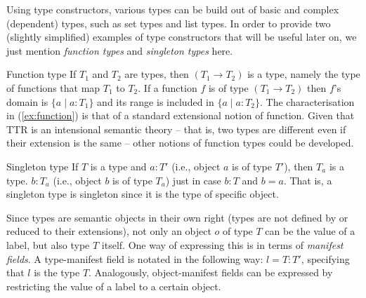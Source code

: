\documentclass[output=paper]{langsci/langscibook}
\begin{document}
{%

Using type constructors, various types can be build out of basic and complex (dependent) types, such as set types and list types. 
%
In order to provide two (slightly simplified) examples of type constructors that will be useful later on, we just mention \emph{function types}  and \emph{singleton types}  here.

\ea Function type \label{ex:function}
\ea If $T_1$ and $T_2$ are types, then $(T_1 \rightarrow T_2)$ is a type, namely the type of functions that map $T_1$ to $T_2$.
\ex If a function $f$ is of type $(T_1 \rightarrow T_2)$ then $f$'s domain is $\{a \mid a : T_1\}$ and its range is included in $\{a \mid a : T_2\}$.
\z
\z 
%
The characterisation in (\ref{ex:function}) is that of a standard extensional notion of function. 
%
Given that TTR is an intensional semantic theory -- that is, two types are different even if their extension is the same -- other notions of function types could be developed.


\ea Singleton type
\ea If $T$ is a type and $a : T'$ (i.e., object $a$ is of type $T'$), then $T_a$ is a type.
\ex $b : T_a$ (i.e., object $b$ is of type $T_a$) just in case $b : T$ and $b = a$.
\z
\z
%
That is, a singleton type is singleton since it is the type of specific object. 

Since types are semantic objects in their own right (types are not defined by or reduced to their extensions), not only an object $o$ of type $T$ can be the value of a label, but also  type $T$ itself.
%
One way of expressing this is in terms of 
\emph{manifest fields}. 
%
A type-manifest field is notated in the following way: $l=T : T'$, specifying that $l$ is the type $T$.
%
Analogously, object-manifest fields can be expressed by restricting the value of a label to a certain object.


}
\end{document}
